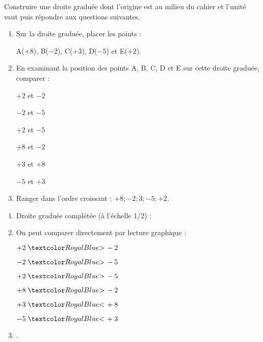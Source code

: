 \begin{Maquette}[Fiche,CorrigeFin,Colonnes=2]{}
\begin{multicols}{2}
      
      \begin{exercice} %
         Construire une droite graduée dont l'origine est au milieu du cahier et l'unité vaut  puis répondre aux questions suivantes.
         \begin{enumerate}
            \item Sur la droite graduée, placer les points : \par
               A($+8$), B($-2$), C($+3$), D($-5$) et E($+2$).
            \item En examinant la position des points A, B, C, D et E sur cette droite graduée, comparer : \par
               \begin{multicols}{3}
                  $+2$ et $-2$ \par
                  $-2$ et $-5$ \par
                  $+2$ et $-5$ \par
                  $+8$ et $-2$ \par
                  $+3$ et $+8$ \par
                  $-5$ et $+3$
               \end{multicols}
            \item Ranger dans l'ordre croissant : $+8 ; -2 ; 3 ; -5 ; +2$.
         \end{enumerate}
      \end{exercice}

      \begin{Solution}
         \begin{enumerate}
            \item Droite graduée complétée (à l'échelle 1/2) : \par
            \hspace*{-10mm} %
            \item On peut comparer directement par lecture graphique :
               \begin{multicols}{3}
                  $+2 \; \cor{>} \, -2$ \par
                  $-2  \; \cor{>} \, -5$ \par
                  $+2 \; \cor{>} \, -5$ \par
                  $+8 \; \cor{>} \, -2$ \par
                  $+3 \; \cor{<} \, +8$ \par
                  $-5 \; \cor{<} \, +3$
               \end{multicols}
            \item {}.
         \end{enumerate}
      \end{Solution}
      

\end{multicols}
\end{Maquette}
